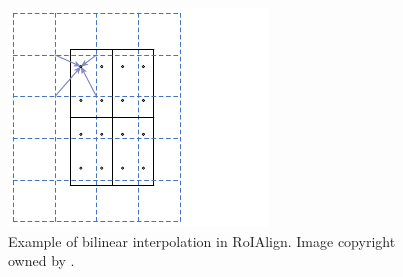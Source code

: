 \begin{figure}[!h]
	\centering
	\includegraphics[width=\figfigfi\textwidth,angle=90]{3-18.pdf}
    \caption[Example of bilinear interpolation in RoIAlign]{Example of bilinear interpolation in RoIAlign. Image copyright owned by \cite{maskrcnn}.}
    \label{fig:roialg}
\end{figure}